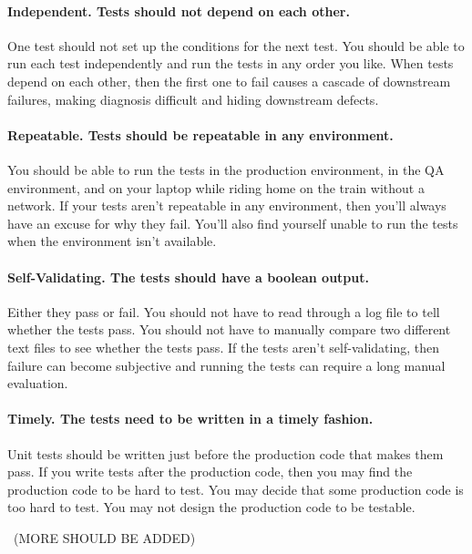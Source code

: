 \paragraph{Independent. Tests should not depend on each other.} 
One test should not set up the conditions for the next test. 
You should be able to run each test independently and run the tests in any order you like. 
When tests depend on each other, then the first one to fail causes a cascade of downstream failures, making diagnosis difficult and hiding downstream defects.\cite{MartinClean}

\paragraph{Repeatable. Tests should be repeatable in any environment.}
You should be able to run the tests in the production environment, in the QA environment, and on your laptop while riding home on the train without a network. 
If your tests aren’t repeatable in any environment, then you’ll always have an excuse for why they fail. 
You’ll also find yourself unable to run the tests when the environment isn’t available.\cite{MartinClean}

\paragraph{Self-Validating. The tests should have a boolean output.}
Either they pass or fail. 
You should not have to read through a log file to tell whether the tests pass. 
You should not have to manually compare two different text files to see whether the tests pass. 
If the tests aren’t self-validating, then failure can become subjective and running the tests can require a long manual evaluation.\cite{MartinClean}

\paragraph{Timely. The tests need to be written in a timely fashion.}
Unit tests should be written just before the production code that makes them pass. 
If you write tests after the production code, then you may find the production code to be hard to test. 
You may decide that some production code is too hard to test. 
You may not design the production code to be testable.\cite{MartinClean}

\
(MORE SHOULD BE ADDED)

